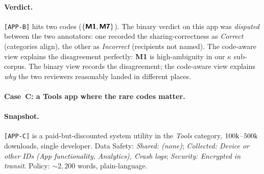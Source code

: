 \documentclass[11pt,a4paper]{article}
\newcommand{\code}[1]{\textsf{\textbf{#1}}}
\begin{document}
\paragraph{Verdict.} \texttt{[APP-B]} hits two codes
($\{\code{M1},\code{M7}\}$). The binary verdict on this app was
\emph{disputed} between the two annotators: one recorded the
sharing-correctness as \emph{Correct} (categories align), the other as
\emph{Incorrect} (recipients not named). The code-aware view explains
the disagreement perfectly: \code{M1} is high-ambiguity in our
$\kappa$ sub-corpus. The binary view records the disagreement; the
code-aware view explains \emph{why} the two reviewers reasonably
landed in different places.

\paragraph{Case~C: a Tools app where the rare codes matter.}
\paragraph{Snapshot.} \texttt{[APP-C]} is a paid-but-discounted system
utility in the \emph{Tools} category, $100{\rm k}$--$500{\rm k}$
downloads, single developer. Data Safety: \textsl{Shared: (none)};
\textsl{Collected: Device or other IDs (App functionality, Analytics),
Crash logs}; \textsl{Security: Encrypted in transit}. Policy:
$\sim 2{,}200$ words, plain-language.
\end{document}
